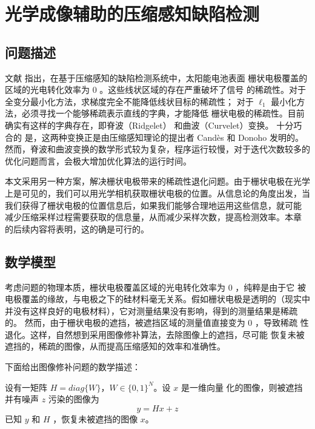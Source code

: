\chapter{光学成像辅助的压缩感知缺陷检测}

\section{问题描述}

文献 \cite{XDUCLBIC} 指出，在基于压缩感知的缺陷检测系统中，太阳能电池表面
栅状电极覆盖的区域的光电转化效率为 $0$ 。这些线状区域的存在严重破坏了信号
的稀疏性。对于全变分最小化方法，求梯度完全不能降低线状目标的稀疏性；
对于 $\ell_1$ 最小化方法，必须寻找一个能够稀疏表示直线的字典，才能降低
栅状电极的稀疏性。目前确实有这样的字典存在，即脊波（Ridgelet）
和曲波（Curvelet）变换\cite{ridgelet}。\cite{curvelet} 十分巧合的
是，这两种变换正是由压缩感知理论的提出者 Cand\`es 和 Donoho 发明的。
然而，脊波和曲波变换的数学形式较为复杂，程序运行较慢，对于迭代次数较多的
优化问题而言，会极大增加优化算法的运行时间。

本文采用另一种方案，解决栅状电极带来的稀疏性退化问题。由于栅状电极在光学
上是可见的，我们可以用光学相机获取栅状电极的位置。从信息论的角度出发，当
我们获得了栅状电极的位置信息后，如果我们能够合理地运用这些信息，就可能
减少压缩采样过程需要获取的信息量，从而减少采样次数，提高检测效率。本章
的后续内容将表明，这的确是可行的。

\section{数学模型}

考虑问题的物理本质，栅状电极覆盖区域的光电转化效率为 $0$ ，纯粹是由于它
被电极覆盖的缘故，与电极之下的硅材料毫无关系。假如栅状电极是透明的（现实中
并没有这样良好的电极材料），它对测量结果没有影响，得到的测量结果是稀疏的。
然而，由于栅状电极的遮挡，被遮挡区域的测量值直接变为 $0$ ，导致稀疏
性退化。这样，自然想到采用图像修补算法，去除图像上的遮挡，尽可能
恢复未被遮挡的，稀疏的图像，从而提高压缩感知的效率和准确性。

下面给出图像修补问题的数学描述：
\begin{problem}[图像修补]
设有一矩阵 $H = diag\{W\}$，$W \in \{0,1\}^{N}$。设 $x$ 是一维向量
化的图像，则被遮挡并有噪声 $z$ 污染的图像为
\begin{equation}
y = Hx + z
\end{equation}
已知 $y$ 和 $H$ ，恢复未被遮挡的图像 $x$。
\end{problem}

